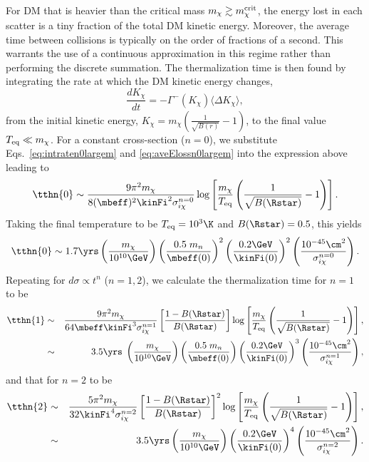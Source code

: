 For DM that is heavier than the critical mass  $m_\chi\gtrsim m_\chi^{\rm crit}$,
the energy lost in each scatter is a tiny fraction of the total DM kinetic energy. Moreover, the average time between collisions is typically on the order of fractions of a second. This warrants the use of a continuous approximation in this regime rather than performing the discrete summation. The thermalization time is then found by integrating the rate at which the DM kinetic energy changes, 
\begin{equation}
    \frac{dK_\chi}{dt} = -\Gamma^{-}(K_\chi) \langle\Delta K_\chi\rangle,  
    \label{eq:contttherm}
\end{equation}
from the initial kinetic energy, $K_\chi=m_\chi\left(\frac{1}{\sqrt{B(r)}}-1\right)$, to the final value $T_{\rm eq}\ll m_\chi$. For a constant cross-section ($n=0$), we substitute  Eqs.~\ref{eq:intraten0largem} and \ref{eq:aveElossn0largem} into the expression above leading to
\begin{equation}
    \tthn{0} \sim \frac{9 \pi^2 m_\chi}{8 (\mbeff)^2 \kinFi^2 \sigma_{i\chi}^{n=0}}\log\left[\frac{m_\chi}{T_{\rm eq}}\left(\frac{1}{\sqrt{B(\Rstar)}}-1\right)\right].
    \label{eq:tthemheavy0}
\end{equation}
Taking the final temperature to be $T_{\rm eq}=10^3\K$ and $B(\Rstar)=0.5$, this yields 
\begin{equation}
    \tthn{0} \sim 1.7  \yrs \left(\frac{m_\chi }{10^{10}\GeV}\right)\left(\frac{0.5\;m_n}{\mbeff(0)}\right)^{2}\left(\frac{0.2\GeV}{\kinFi(0)}\right)^{2}\left(\frac{10^{-45}\cm^2}{\sigma_{i\chi}^{n=0}}\right).    
\end{equation}
%
Repeating for $d\sigma\propto t^n$ ($n=1,2$), we calculate the thermalization time for $n=1$ to be
\begin{eqnarray}
    \tthn{1} &\sim& \frac{9\pi^2 m_\chi}{ 64 \mbeff \kinFi^3 \sigma_{i\chi}^{n=1}}\left[\frac{1-B(\Rstar)}{B(\Rstar)}\right] \log\left[\frac{m_\chi}{T_{\rm eq}} \left(\frac{1}{\sqrt{B(\Rstar)}}-1\right)\right],\\
    &\sim& 3.5 \yrs\; \left(\frac{m_\chi}{10^{10} \GeV}\right)\left(\frac{0.5\;m_n}{\mbeff(0)}\right) \left(\frac{0.2\GeV}{\kinFi(0)}\right)^{3}\left(\frac{10^{-45}\cm^2}{\sigma_{i\chi}^{n=1}}\right),
\end{eqnarray}
and that for $n=2$ to be
\begin{eqnarray}
    \tthn{2} &\sim& \frac{5 \pi^2 m_\chi}{ 32 \kinFi^4\sigma_{i\chi}^{n=2}} \left[\frac{1-B(\Rstar)}{B(\Rstar)}\right]^2 \log\left[\frac{m_\chi}{T_{\rm eq}}\left(\frac{1}{\sqrt{B(\Rstar)}}-1\right)\right],\\
    &\sim& 3.5 \yrs \left( \frac{m_\chi}{10^{10} \GeV}\right) \left(\frac{0.2\GeV}{\kinFi(0)}\right)^{4}\left(\frac{10^{-45}\cm^2}{\sigma_{i\chi}^{n=2}}\right). 
\end{eqnarray}







